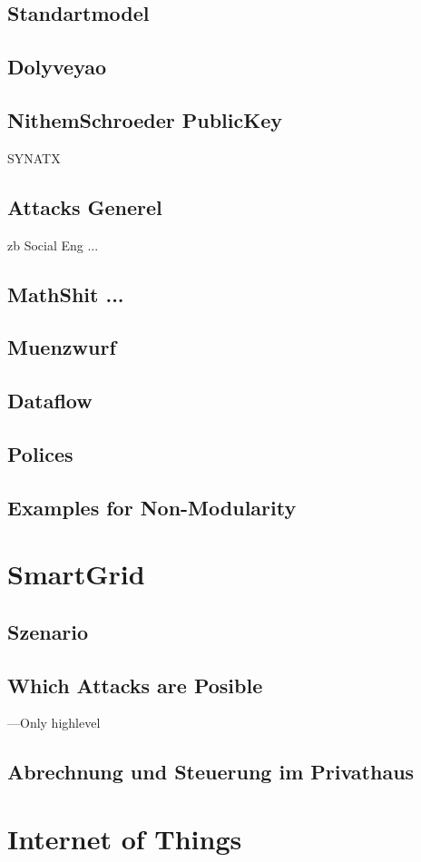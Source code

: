 \documentclass[a4paper, 12pt]{article}
\begin{document}
\subsection{Standartmodel}
\subsection{Dolyveyao}
\subsection{NithemSchroeder PublicKey}
SYNATX
\subsection{Attacks Generel}
zb Social Eng ...
\subsection{MathShit ...}
\subsection{Muenzwurf}
\subsection{Dataflow}
\subsection{Polices}
\subsection{Examples for Non-Modularity}

\section{SmartGrid}
\subsection{Szenario}
\subsection{Which Attacks are Posible}
---Only highlevel
\subsection{Abrechnung und Steuerung im Privathaus}

\section{Internet of Things}
\end{document}
